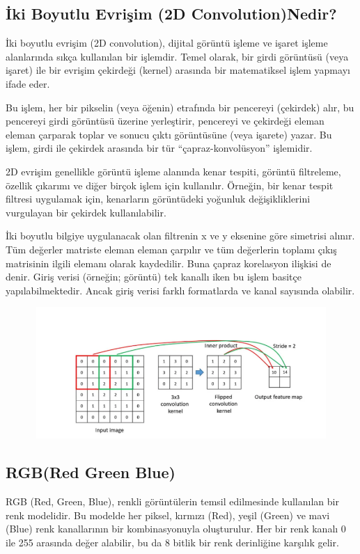 \documentclass[12pt]{article}
\begin{document}
\subsection{İki Boyutlu Evrişim (2D Convolution)Nedir?}
İki boyutlu evrişim (2D convolution), dijital görüntü işleme ve işaret işleme alanlarında sıkça kullanılan bir işlemdir. Temel olarak, bir girdi görüntüsü (veya işaret) ile bir evrişim çekirdeği (kernel) arasında bir matematiksel işlem yapmayı ifade eder.

Bu işlem, her bir pikselin (veya öğenin) etrafında bir pencereyi (çekirdek) alır, bu pencereyi girdi görüntüsü üzerine yerleştirir, pencereyi ve çekirdeği eleman eleman çarparak toplar ve sonucu çıktı görüntüsüne (veya işarete) yazar. Bu işlem, girdi ile çekirdek arasında bir tür “çapraz-konvolüsyon” işlemidir.

2D evrişim genellikle görüntü işleme alanında kenar tespiti, görüntü filtreleme, özellik çıkarımı ve diğer birçok işlem için kullanılır. Örneğin, bir kenar tespit filtresi uygulamak için, kenarların görüntüdeki yoğunluk değişikliklerini vurgulayan bir çekirdek kullanılabilir.

İki boyutlu bilgiye uygulanacak olan filtrenin x ve y eksenine göre simetrisi alınır. Tüm değerler matriste eleman eleman çarpılır ve tüm değerlerin toplamı çıkış matrisinin ilgili elemanı olarak kaydedilir. Buna çapraz korelasyon ilişkisi de denir. Giriş verisi (örneğin; görüntü) tek kanallı iken bu işlem basitçe yapılabilmektedir. Ancak giriş verisi farklı formatlarda ve kanal sayısında olabilir.
\begin{figure}[h]
    \centering
    \includegraphics[width=7\textwidth, height=5cm, keepaspectratio]{2d1.png}
    \label{fig:enter-label}
\end{figure}
\subsection{RGB(Red Green Blue)}
RGB (Red, Green, Blue), renkli görüntülerin temsil edilmesinde kullanılan bir renk modelidir. Bu modelde her piksel, kırmızı (Red), yeşil (Green) ve mavi (Blue) renk kanallarının bir kombinasyonuyla oluşturulur. Her bir renk kanalı 0 ile 255 arasında değer alabilir, bu da 8 bitlik bir renk derinliğine karşılık gelir.
\end{document}
